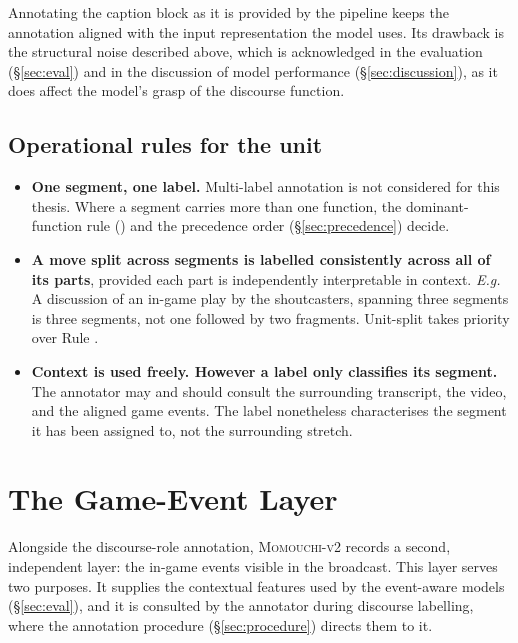 Annotating the caption block as it is provided by the pipeline keeps the annotation aligned with the input representation the model uses. Its drawback is the structural noise described above, which is acknowledged in the evaluation (\S\ref{sec:eval}) and in the discussion of model performance (\S\ref{sec:discussion}), as it does affect the model's grasp of the discourse function.


\subsection{Operational rules for the unit}

\begin{itemize}
  \item {} \textbf{One segment, one label.} Multi-label
    annotation is not considered for this thesis. Where a segment carries more than one function, the dominant-function rule () and the precedence order (\S\ref{sec:precedence}) decide.

  \item {} \textbf{A move split across segments is labelled consistently across all of its parts}, provided each part is independently interpretable in context. \textit{E.g.} A discussion of an in-game play by the shoutcasters, spanning three segments is three \SA{} segments, not one \SA{} followed by two fragments. Unit-split takes priority over Rule .

  \item {} \textbf{Context is used freely. However a label only classifies its segment.} The annotator may and should  consult the surrounding transcript, the video, and the aligned game events. The label nonetheless characterises the segment it has been assigned to, not the surrounding stretch.
\end{itemize}


\section{The Game-Event Layer}
\label{sec:events}

Alongside the discourse-role annotation, \textsc{Momouchi-v2} records a second, independent layer: the in-game events visible in the broadcast. This layer serves two purposes. It supplies the contextual features used by the event-aware models (\S\ref{sec:eval}), and it is consulted by the annotator during discourse labelling, where the annotation procedure (\S\ref{sec:procedure}) directs them to it.

